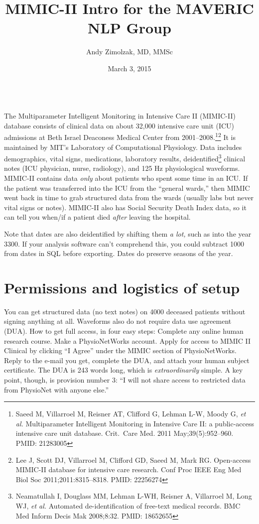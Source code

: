 \documentclass{tufte-handout}
\title{MIMIC-II Intro for the MAVERIC NLP Group}
\author{Andy Zimolzak, MD, MMSc}
\date{March 3, 2015}
\begin{document}
\maketitle

~\\

The Multiparameter Intelligent Monitoring in Intensive Care II
(MIMIC-II) database consists of clinical data on about 32,000
intensive care unit (ICU) admissions at Beth Israel Deaconess Medical
Center from 2001--2008.\footnote{Saeed M, Villarroel M, Reisner AT,
  Clifford G, Lehman L-W, Moody G, \emph{et al.} Multiparameter
  Intelligent Monitoring in Intensive Care II: a public-access
  intensive care unit database. Crit.\ Care Med. 2011
  May;39(5):952--960. PMID: 21283005}\footnote{Lee J, Scott DJ,
  Villarroel M, Clifford GD, Saeed M, Mark RG. Open-access MIMIC-II
  database for intensive care research. Conf Proc IEEE Eng Med Biol
  Soc 2011;2011:8315--8318. PMID: 22256274} It is maintained by MIT's
Laboratory of Computational Physiology. Data includes demographics,
vital signs, medications, laboratory results,
deidentified\footnote{Neamatullah I, Douglass MM, Lehman L-WH, Reisner
  A, Villarroel M, Long WJ, \emph{et al.} Automated de-identification
  of free-text medical records. BMC Med Inform Decis Mak 2008;8:32.
  PMID: 18652655 } clinical notes (ICU physician, nurse, radiology),
and 125 Hz physiological waveforms. MIMIC-II contains data \emph{only}
about patients who spent some time in an ICU. If the patient was
transferred into the ICU from the ``general wards,'' then MIMIC went
back in time to grab structured data from the wards (usually labs but
never vital signs or notes). MIMIC-II also has Social Security Death
Index data, so it can tell you when/if a patient died \emph{after}
leaving the hospital.

Note that dates are also deidentified by shifting them \emph{a lot,}
such as into the year 3300. If your analysis software can't comprehend
this, you could subtract 1000 from dates in SQL before exporting.
Dates do preserve seasons of the year. 


\section{Permissions and logistics of setup}

You can get structured data (no text notes) on 4000 deceased patients
without signing anything at all. Waveforms also do not require data
use agreement (DUA). How to get full access, in four easy steps:
Complete any online human research course. Make a PhysioNetWorks
account. Apply for access to MIMIC II Clinical by clicking ``I Agree''
under the MIMIC section of PhysioNetWorks. Reply to the e-mail you
get, complete the DUA, and attach your human subject certificate. The
DUA is 243 words long, which is \emph{extraordinarily} simple. A key
point, though, is provision number 3: ``I will not share access to
restricted data from PhysioNet with anyone else.''
\end{document}

